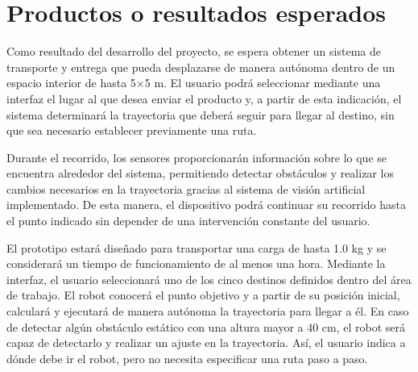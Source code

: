 %
%

\chapter{Productos o resultados esperados}
\label{cap:proto-productos-esperados}



Como resultado del desarrollo del proyecto, se espera obtener un sistema de transporte y entrega que pueda desplazarse de manera autónoma dentro de un espacio interior de hasta 5×5 m. El usuario podrá seleccionar mediante una interfaz el lugar al que desea enviar el producto y, a partir de esta indicación, el sistema determinará la trayectoria que deberá seguir para llegar al destino, sin que sea necesario establecer previamente una ruta.

Durante el recorrido, los sensores proporcionarán información sobre lo que se encuentra alrededor del sistema, permitiendo detectar obstáculos y realizar los cambios necesarios en la trayectoria gracias al sistema de visión artificial implementado. De esta manera, el dispositivo podrá continuar su recorrido hasta el punto indicado sin depender de una intervención constante del usuario.

El prototipo estará diseñado para transportar una carga de hasta 1.0 kg y se considerará un tiempo de funcionamiento de al menos una hora. Mediante la interfaz, el usuario seleccionará uno de los cinco destinos definidos dentro del área de trabajo. El robot conocerá el punto objetivo y a partir de su posición inicial, calculará y ejecutará de manera autónoma la trayectoria para llegar a él. En caso de detectar algún obstáculo estático con una altura mayor a 40 cm, el robot será capaz de detectarlo y realizar un ajuste en la trayectoria. Así, el usuario indica a dónde debe ir el robot, pero no necesita especificar una ruta paso a paso.

